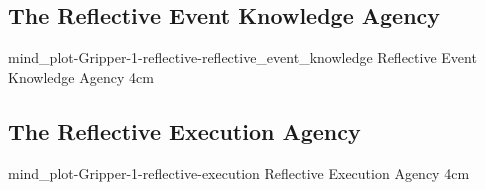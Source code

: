 {\clearpage
  \subsection{The Reflective Event Knowledge Agency}
  \experimentcausegroupplots{\dataappendixmaxtime}
                            {\dataappendixexperimentonemaxtime}
                            {\dataappendixexperimenttwomaxtime}
                            {\dataappendixexperimentthreemaxtime}
                            {\dataappendixexperimentonename}
                            {\dataappendixexperimenttwoname}
                            {\dataappendixexperimentthreename}
                            {\dataappendixexperimentoneprettyname}
                            {\dataappendixexperimenttwoprettyname}
                            \experimentcausegroupplotscontinued{\dataappendixexperimentthreeprettyname}
                                                               {mind_plot-Gripper-1-reflective-reflective_event_knowledge}
                                                               {Reflective Event Knowledge Agency}
                                                               {\experimentdatacommontablereference}
                                                               {4cm}
}
{\clearpage
  \subsection{The Reflective Execution Agency}
  \experimentcausegroupplots{\dataappendixmaxtime}
                            {\dataappendixexperimentonemaxtime}
                            {\dataappendixexperimenttwomaxtime}
                            {\dataappendixexperimentthreemaxtime}
                            {\dataappendixexperimentonename}
                            {\dataappendixexperimenttwoname}
                            {\dataappendixexperimentthreename}
                            {\dataappendixexperimentoneprettyname}
                            {\dataappendixexperimenttwoprettyname}
                            \experimentcausegroupplotscontinued{\dataappendixexperimentthreeprettyname}
                                                               {mind_plot-Gripper-1-reflective-execution}
                                                               {Reflective Execution Agency}
                                                               {\experimentdatacommontablereference}
                                                               {4cm}
}
